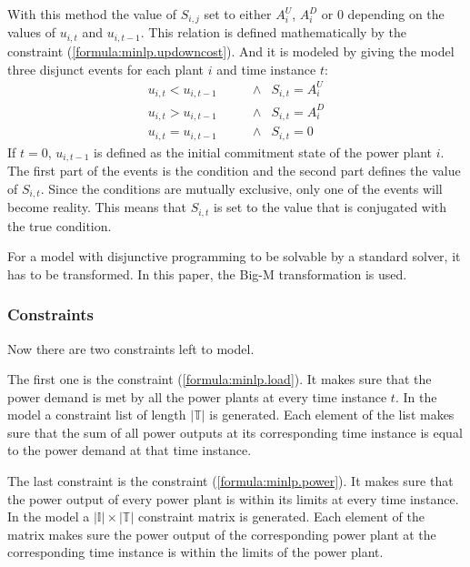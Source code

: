 With this method the value of $S_{i, j}$ set to either $A^U_i$, $A^D_i$ or $0$
depending on the values of $u_{i, t}$ and $u_{i, t-1}$.
This relation is defined mathematically by the constraint (\ref{formula:minlp.updowncost}).
And it is modeled by giving the model three disjunct events for each plant $i$ and time instance $t$:
\begin{subequations}
\begin{align}
  u_{i, t} < u_{i, t-1} \quad \quad & \land & S_{i, t} = A^U_i \\
  u_{i, t} > u_{i, t-1} \quad \quad & \land & S_{i, t} = A^D_i \\
  u_{i, t} = u_{i, t-1} \quad \quad & \land & S_{i, t} = 0
\end{align}
\end{subequations}
If $t = 0$, $u_{i, t-1}$ is defined as the initial commitment state of the power plant $i$.
The first part of the events is the condition and the second part defines the value of $S_{i, t}$.
Since the conditions are mutually exclusive,
only one of the events will become reality.
This means that $S_{i, t}$ is set to the value that is conjugated with the true condition.

For a model with disjunctive programming to be solvable by a standard solver,
it has to be transformed.
In this paper, the Big-M transformation is used.
\cite{Trespalacios2015}

\subsubsection{Constraints}

Now there are two constraints left to model.

The first one is the constraint (\ref{formula:minlp.load}).
It makes sure that the power demand is met by all the power plants at every time instance $t$.
In the model a constraint list of length $|\mathbb{T}|$ is generated.
Each element of the list makes sure that the sum of all power outputs at its corresponding time instance
is equal to the power demand at that time instance.

The last constraint is the constraint (\ref{formula:minlp.power}).
It makes sure that the power output of every power plant is within its limits at every time instance.
In the model a $|\mathbb{I}| \times |\mathbb{T}|$ constraint matrix is generated.
Each element of the matrix makes sure the power output of the corresponding power plant
at the corresponding time instance is within the limits of the power plant.

